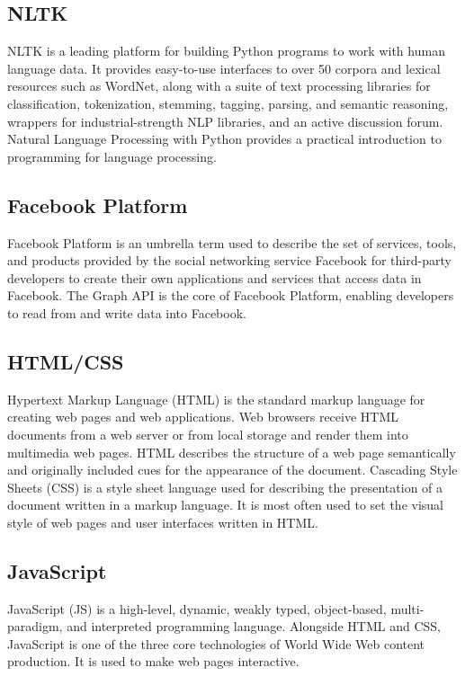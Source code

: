 \subsection{NLTK}
NLTK is a leading platform for building Python programs to work with human language data. It provides easy-to-use interfaces to over 50 corpora and lexical resources such as WordNet, along with a suite of text processing libraries for classification, tokenization, stemming, tagging, parsing, and semantic reasoning, wrappers for industrial-strength NLP libraries, and an active discussion forum.
Natural Language Processing with Python provides a practical introduction to programming for language processing.


\subsection{Facebook Platform}
Facebook Platform is an umbrella term used to describe the set of services, tools, and products provided by the social networking service Facebook for third-party developers to create their own applications and services that access data in Facebook. The Graph API is the core of Facebook Platform, enabling developers to read from and write data into Facebook.

\subsection{HTML/CSS}
Hypertext Markup Language (HTML) is the standard markup language for creating web pages and web applications. Web browsers receive HTML documents from a web server or from local storage and render them into multimedia web pages. HTML describes the structure of a web page semantically and originally included cues for the appearance of the document.
Cascading Style Sheets (CSS) is a style sheet language used for describing the presentation of a document written in a markup language. It is most often used to set the visual style of web pages and user interfaces written in HTML.

\subsection{JavaScript}
 JavaScript (JS) is a high-level, dynamic, weakly typed, object-based, multi-paradigm, and interpreted programming language. Alongside HTML and CSS, JavaScript is one of the three core technologies of World Wide Web content production. It is used to make web pages interactive.


